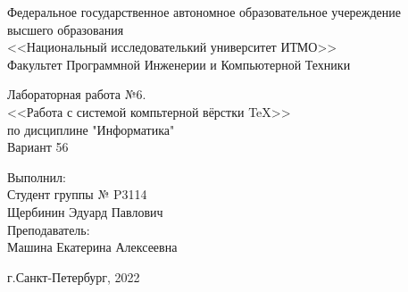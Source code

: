 \centering
\pagestyle{empty} %
\LARGE
Федеральное государственное автономное образовательное учереждение
\\высшего образования
\\<<Национальный исследователький университет ИТМО>>
\\ Факультет Программной Инженерии и Компьютерной Техники

\vspace{5cm}
\begin{center}
\huge
Лабораторная работа №6.
\\<<Работа с системой компьтерной вёрстки \TeX{}>>
\\по дисциплине "Информатика"
\\Вариант 56
\LARGE
\end{center}

\vspace{5cm}

\begin{flushright}
Выполнил:
\\Студент группы № P3114
\\Щербинин Эдуард Павлович
\\Преподаватель:
\\Машина Екатерина Алексеевна
\end{flushright}

\vspace{4cm}

г.Санкт-Петербург, 2022
\normalsize
\newpage
\pagestyle{plain} %
